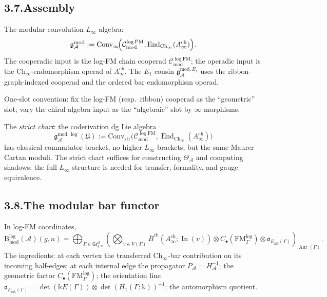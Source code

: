 \documentclass[11pt,reqno]{amsart}
\theoremstyle{definition}
\theoremstyle{remark}
\providecommand{\cA}{\mathcal{A}}
\providecommand{\cC}{\mathcal{C}}
\providecommand{\Bbbk}{\mathbb{k}}
\providecommand{\Convinf}{\mathrm{Conv}_\infty}
\providecommand{\Convstr}{\mathrm{Conv}_{\mathrm{str}}}
\providecommand{\orline}[1]{\mathfrak{o}_{#1}}
\numberwithin{equation}{section}
\begin{document}
\subsection*{3.7.\enspace Assembly}

The modular convolution $L_\infty$-algebra:
\begin{equation}\label{eq:pref-convolution}
\mathfrak g^{\mathrm{mod}}_\cA:=\Convinf\!\Bigl(\cC^{\log\mathrm{FM}}_{\mathrm{mod}},\operatorname{End}_{\mathrm{Ch}_\infty}(A^{\mathrm{ch}}_\infty)\Bigr).
\end{equation}
The cooperadic input is the log-FM chain cooperad
$\cC^{\log\mathrm{FM}}_{\mathrm{mod}}$; the operadic input is the
$\mathrm{Ch}_\infty$-endomorphism operad of
$A^{\mathrm{ch}}_\infty$. The $E_1$ cousin
$\mathfrak g^{\mathrm{mod},E_1}_\cA$ uses the ribbon-graph-indexed
cooperad and the ordered bar endomorphism operad.

One-slot convention: fix the log-FM (resp.\ ribbon) cooperad as the
``geometric'' slot; vary the chiral algebra input as the ``algebraic''
slot by $\infty$-morphisms.

The \emph{strict chart}: the coderivation dg Lie algebra
\[
\mathfrak g^{\mathrm{mod},\log}_\cA(\mathfrak U):=\Convstr\!\bigl(\cC^{\log\mathrm{FM}}_{\mathrm{mod}},\operatorname{End}_{\mathrm{Ch}_\infty}(A^{\mathrm{ch}}_\infty)\bigr)
\]
has classical commutator bracket, no higher $L_\infty$ brackets, but
the same Maurer--Cartan moduli. The strict chart suffices for
constructing $\Theta_\cA$ and computing shadows; the full $L_\infty$
structure is needed for transfer, formality, and gauge equivalence.

\subsection*{3.8.\enspace The modular bar functor}

In log-FM coordinates,
\[
\mathrm B^{\log}_{\mathrm{mod}}(\cA)(g,n)=\bigoplus_{\Gamma\in\mathsf{Gr}^{\mathrm{st}}_{g,n}}\left(\bigotimes_{v\in V(\Gamma)}\bar B^{\mathrm{ch}}(A^{\mathrm{ch}}_\infty;\operatorname{In}(v))\otimes C_\bullet(\mathrm{FM}^{\log}_\Gamma)\otimes\orline{E_{\mathrm{int}}(\Gamma)}\right)_{\!\operatorname{Aut}(\Gamma)}.
\]
The ingredients: at each vertex the transferred
$\mathrm{Ch}_\infty$-bar contribution on its incoming half-edges;
at each internal edge the propagator $P_\cA=H_\cA^{-1}$; the geometric
factor $C_\bullet(\mathrm{FM}^{\log}_\Gamma)$; the orientation line
$\orline{E_{\mathrm{int}}(\Gamma)}=\det(\Bbbk E(\Gamma))\otimes\det(H_1(\Gamma;\Bbbk))^{-1}$;
the automorphism quotient.
\end{document}
